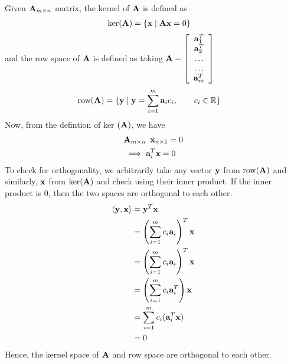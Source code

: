 \documentclass[12pt, a4paper]{article}
\begin{document}
\section{}
Given $\textbf{A}_{m \times n}$ matrix, the kernel of $\textbf{A}$ is defined as
\begin{align*}
    \text{ker} (\textbf{A}) &= \{ \textbf{x} \mid \textbf{A} \textbf{x} = 0 \}
\end{align*}
and the row space of $\textbf{A}$ is defined as taking $\textbf{A} =
\left[ {\begin{array}{c}
    \textbf{a}_1^T \\
    \textbf{a}_2^T \\
 \ldots \\
 \ldots \\
    \textbf{a}_m^T
 \end{array} } \right]$
\begin{align*}
    \text{row} (\textbf{A}) &= \{ \textbf{y} \mid \textbf{y} = \sum_{i=1}^{m} \textbf{a}_i c_i,\qquad c_i \in \mathbb{R}\}
\end{align*}
Now, from the defintion of ker $(\textbf{A})$, we have
\begin{align*}
    &\textbf{A}_{m \times n}  \hskip0.5em \textbf{x}_{n \times 1} = 0 \\
    &\implies \textbf{a}_i^T \textbf{x} = 0
\end{align*}
To check for orthogonality, we arbitrarily take any vector $\textbf{y}$ from $\text{row} (\textbf{A})$ and similarly, $\textbf{x}$ from $\text{ker} (\textbf{A})$ and check using their inner product. If the inner product is 0, then the two spaces are orthogonal to each other.
\begin{align*}
    \langle \textbf{y}, \textbf{x} \rangle &= \textbf{y}^T \textbf{x} \\
    &= \left (\sum_{i=1}^m c_i\textbf{a}_i \right)^T  \textbf{x} \\
    &= \left (\sum_{i=1}^m c_i\textbf{a}_i \right)^T  \textbf{x} \\
    &=  \left (\sum_{i=1}^m c_i \textbf{a}_i^T\right)  \textbf{x} \\
    &= \sum_{i=1}^m c_i (\textbf{a}_i^T  \textbf{x}) \\
    &= 0
\end{align*}
Hence, the kernel space of $\textbf{A}$ and row space are orthogonal to each other.

\newpage
\section{}
\end{document}
